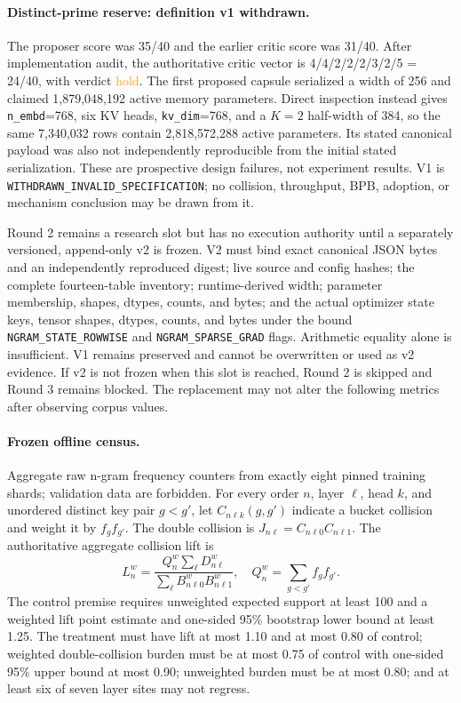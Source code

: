 \documentclass{article}
\newcommand{\holdx}{\textcolor{orange}{hold}}
\begin{document}
\paragraph{Distinct-prime reserve: definition v1 withdrawn.}
The proposer score was 35/40 and the earlier critic score was 31/40.  After
implementation audit, the authoritative critic vector is
4/4/2/2/2/3/2/5 = 24/40, with verdict \holdx{}.  The first proposed capsule
serialized a width of 256 and claimed
1,879,048,192 active memory parameters.  Direct inspection instead gives
\texttt{n\_embd}=768, six KV heads, \texttt{kv\_dim}=768, and a
$K=2$ half-width of 384, so the same 7,340,032 rows contain
2,818,572,288 active parameters.  Its stated canonical payload was also
not independently reproducible from the initial stated serialization.
These are prospective design failures, not experiment results.  V1 is
\texttt{WITHDRAWN\_INVALID\_SPECIFICATION}; no collision, throughput, BPB,
adoption, or mechanism conclusion may be drawn from it.

Round 2 remains a research slot but has no execution authority until a
separately versioned, append-only v2 is frozen.  V2 must bind exact canonical
JSON bytes and an independently reproduced digest; live source and config
hashes; the complete fourteen-table inventory; runtime-derived width;
parameter membership, shapes, dtypes, counts, and bytes; and the actual
optimizer state keys, tensor shapes, dtypes, counts, and bytes under the bound
\texttt{NGRAM\_STATE\_ROWWISE} and \texttt{NGRAM\_SPARSE\_GRAD} flags.
Arithmetic equality alone is insufficient.  V1 remains preserved and cannot
be overwritten or used as v2 evidence.  If v2 is not frozen when this slot is
reached, Round 2 is skipped and Round 3 remains blocked.  The replacement may
not alter the following metrics after observing corpus values.

\paragraph{Frozen offline census.}
Aggregate raw n-gram frequency counters from exactly eight pinned training
shards; validation data are forbidden.  For every order $n$, layer $\ell$,
head $k$, and unordered distinct key pair $g<g'$, let $C_{n\ell k}(g,g')$
indicate a bucket collision and weight it by $f_gf_{g'}$.  The double
collision is $J_{n\ell}=C_{n\ell0}C_{n\ell1}$.  The authoritative aggregate
collision lift is
\[
L_n^w =
\frac{Q_n^w\sum_\ell D_{n\ell}^w}
{\sum_\ell B_{n\ell0}^w B_{n\ell1}^w},
\quad
Q_n^w=\sum_{g<g'}f_gf_{g'}.
\]
The control premise requires unweighted expected support at least 100 and a
weighted lift point estimate and one-sided 95\% bootstrap lower bound at
least 1.25.  The treatment must have lift at most 1.10 and at most 0.80 of
control; weighted double-collision burden must be at most 0.75 of control
with one-sided 95\% upper bound at most 0.90; unweighted burden must be at
most 0.80; and at least six of seven layer sites may not regress.
\end{document}
